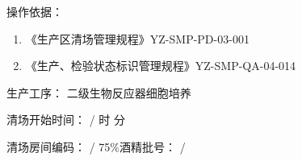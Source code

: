 \documentclass[UTF8,10pt,a4paper,fontset=fandol]{ctexart}
\newcommand{\fieldvalue}[1]{#1}
\newcommand{\handwritten}[1]{#1}
\begin{document}
操作依据：

\begin{enumerate}
\item 《生产区清场管理规程》\hfill YZ-SMP-PD-03-001
\item 《生产、检验状态标识管理规程》\hfill YZ-SMP-QA-04-014
\end{enumerate}

\noindent
生产工序：%
\fieldvalue{二级生物反应器细胞培养}

\medskip

\noindent
清场开始时间：%
\fieldvalue{\handwritten{/}} \quad 时\quad
\underline{\hspace{1.2em}} 分

\noindent
清场房间编码：%
\fieldvalue{\handwritten{/}}
\hfill
75\%酒精批号：%
\fieldvalue{\handwritten{/}}

\vspace{0.5em}
\end{document}
